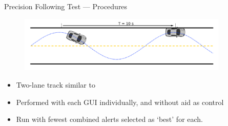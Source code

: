 \documentclass{beamer}
\begin{document}
    \begin{frame}{Precision Following Test --- Procedures}
      \begin{figure}
        \includegraphics[width=10cm]{../graphics/precision_following_diagram.png}
      \end{figure}   
      \begin{itemize} \footnotesize
        \item Two-lane track similar to 
        \item Performed with each GUI individually, and without aid as control
        \item Run with fewest combined alerts selected as `best' for each.
      \end{itemize}
    \end{frame}
\end{document}

